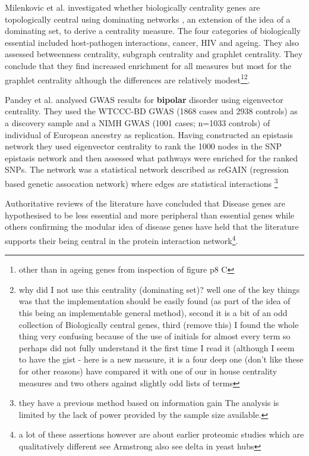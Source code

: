 Milenkovic et al.\cite{milenkovic2011dominating} investigated whether biologically centrality genes are topologically central using dominating networks , an extension of the idea of a dominating set, to derive a centrality measure. The four categories of biologically essential included host-pathogen interactions, cancer, HIV and ageing. They also assessed betweenness centrality, subgraph centrality and graphlet centrality. They conclude that they find increased enrichment for all measures but most for the graphlet centrality although the differences are relatively modest\footnote{ other than in ageing genes from inspection of figure p8 C}\footnote{why did I not use this centrality (dominating set)? well one of the key things was that the implementation should be easily found (as part of the idea of this being an implementable general method), second it is a bit of an odd collection of Biologically central genes, third (remove this) I found the whole thing very confusing because of the use of initials for almost every term so perhaps did not fully understand it the first time I read it (although I seem to have the gist - here is a new measure, it is a four deep one (don't like these for other reasons) have compared it with one of our in house centrality measures and two others against slightly odd lists of terms}.  

Pandey et al.\cite{pandey2012epistasis} analysed GWAS results for \textbf{bipolar} disorder using eigenvector centrality. They used the WTCCC-BD GWAS (1868 cases and 2938 controls) as a discovery sample and  a NIMH GWAS (1001 cases; n=1033 controls) of individual of European ancestry as replication. Having constructed an epistasis network they used eigenvector centrality to rank the 1000 nodes in the SNP epistasis network and then assessed what pathways were enriched for the ranked SNPs. The network was a statistical network described as reGAIN (regression based genetic assocation network) where edges are statistical interactions \footnote{they have a previous method based on information gain The analysis is limited by the lack of power provided by the sample size available.}

Authoritative reviews of the literature have concluded that Disease genes are hypothesised to be less essential\cite{barabasi2011network} and more peripheral than essential genes while others confirming the modular idea of disease genes have held that the literature supports their being central in the protein interaction network\cite{ideker2008protein}\footnote{a lot of these assertions however are about earlier proteomic studies which are qualitatively different see Armstrong also see delta in yeast hubs}.

